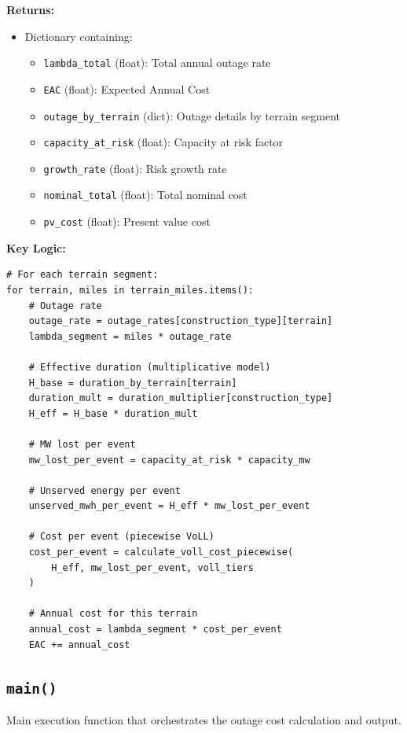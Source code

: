 \documentclass[12pt]{article}
\begin{document}
\textbf{Returns:}
\begin{itemize}
    \item Dictionary containing:
    \begin{itemize}
        \item \texttt{lambda\_total} (float): Total annual outage rate
        \item \texttt{EAC} (float): Expected Annual Cost
        \item \texttt{outage\_by\_terrain} (dict): Outage details by terrain segment
        \item \texttt{capacity\_at\_risk} (float): Capacity at risk factor
        \item \texttt{growth\_rate} (float): Risk growth rate
        \item \texttt{nominal\_total} (float): Total nominal cost
        \item \texttt{pv\_cost} (float): Present value cost
    \end{itemize}
\end{itemize}

\textbf{Key Logic:}
\begin{lstlisting}
# For each terrain segment:
for terrain, miles in terrain_miles.items():
    # Outage rate
    outage_rate = outage_rates[construction_type][terrain]
    lambda_segment = miles * outage_rate
    
    # Effective duration (multiplicative model)
    H_base = duration_by_terrain[terrain]
    duration_mult = duration_multiplier[construction_type]
    H_eff = H_base * duration_mult
    
    # MW lost per event
    mw_lost_per_event = capacity_at_risk * capacity_mw
    
    # Unserved energy per event
    unserved_mwh_per_event = H_eff * mw_lost_per_event
    
    # Cost per event (piecewise VoLL)
    cost_per_event = calculate_voll_cost_piecewise(
        H_eff, mw_lost_per_event, voll_tiers
    )
    
    # Annual cost for this terrain
    annual_cost = lambda_segment * cost_per_event
    EAC += annual_cost
\end{lstlisting}

\subsection{\texttt{main()}}

Main execution function that orchestrates the outage cost calculation and output.
\end{document}
